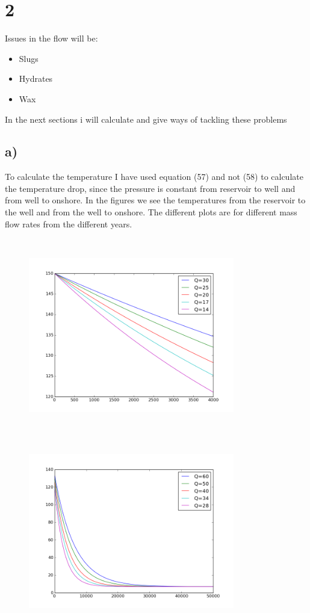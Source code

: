 \documentclass[DIV=calc, paper=a4, fontsize=13pt, twocolumn]{scrartcl}	 %
\begin{document}
\newpage
\section*{2}
Issues in the flow will be:
\begin{itemize}
\item Slugs
\item Hydrates
\item Wax
\end{itemize}
In the next sections i will calculate and give ways of tackling these problems
\subsection*{a)}
To calculate the temperature 
I have used equation (57) and not (58) to calculate the temperature drop, since the pressure is constant from reservoir to well and from well to onshore.
In the figures we see the temperatures from the reservoir to the well and from the well to onshore. The different plots are for different mass flow rates from the different years.
\begin{figure}[h]
\includegraphics[width=9cm,height=8.5cm]{Temp1.png}
\includegraphics[width=9cm,height=8.5cm]{temp2.png}
\end{figure}
\end{document}
